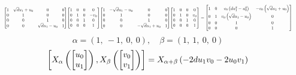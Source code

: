 \documentclass[11pt]{article}
\theoremstyle{definition}
\begin{document}
\[
\scaletoalign{\textwidth}{{\left[\begin{matrix}1 & \sqrt{d} u_{1} + u_{0} & 0 & 0\\0 & 1 & 0 & 0\\0 & 0 & 1 & 0\\0 & 0 & \sqrt{d} u_{1} - u_{0} & 1\end{matrix}\right]} {\left[\begin{matrix}1 & 0 & 0 & 0\\0 & 1 & 0 & - v_{0}\\0 & 0 & 1 & 0\\0 & 0 & 0 & 1\end{matrix}\right]} {\left[\begin{matrix}1 & - \sqrt{d} u_{1} - u_{0} & 0 & 0\\0 & 1 & 0 & 0\\0 & 0 & 1 & 0\\0 & 0 & - \sqrt{d} u_{1} + u_{0} & 1\end{matrix}\right]} {\left[\begin{matrix}1 & 0 & 0 & 0\\0 & 1 & 0 & v_{0}\\0 & 0 & 1 & 0\\0 & 0 & 0 & 1\end{matrix}\right]} = {\left[\begin{matrix}1 & 0 & v_{0} \left(d u_{1}^{2} - u_{0}^{2}\right) & - v_{0} \left(\sqrt{d} u_{1} + u_{0}\right)\\0 & 1 & v_{0} \left(\sqrt{d} u_{1} - u_{0}\right) & 0\\0 & 0 & 1 & 0\\0 & 0 & 0 & 1\end{matrix}\right]}}
\]
\[
\alpha = \left( 1, \  -1, \  0, \  0\right), \quad \beta = \left( 1, \  1, \  0, \  0\right)
\]
\[
\scaletoalign{\textwidth}{\left[ X_{\alpha}\left(\left[\begin{matrix}u_{0}\\u_{1}\end{matrix}\right]\right), X_{\beta}\left(\left[\begin{matrix}v_{0}\\v_{1}\end{matrix}\right]\right) \right] = X_{\alpha + \beta}\left(- 2 d u_{1} v_{0} - 2 u_{0} v_{1}\right)}
\]
\end{document}
